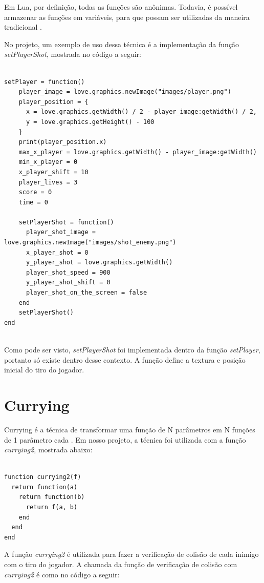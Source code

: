 \documentclass[rel_mlp]{iiufrgs}
\begin{document}
Em Lua, por definição, todas as funções são anônimas. Todavia, é possível armazenar as funções em variáveis, para que possam ser utilizadas da maneira tradicional \cite{IntroLuaPDF}.

No projeto, um exemplo de uso dessa técnica é a implementação da função \textit{setPlayerShot}, mostrada no código a seguir:

\begin{lstlisting}

setPlayer = function()
    player_image = love.graphics.newImage("images/player.png")
    player_position = {
      x = love.graphics.getWidth() / 2 - player_image:getWidth() / 2,
      y = love.graphics.getHeight() - 100
    }
    print(player_position.x)
    max_x_player = love.graphics.getWidth() - player_image:getWidth()
    min_x_player = 0
    x_player_shift = 10
    player_lives = 3
    score = 0
    time = 0

    setPlayerShot = function()
      player_shot_image = love.graphics.newImage("images/shot_enemy.png")
      x_player_shot = 0
      y_player_shot = love.graphics.getWidth()
      player_shot_speed = 900
      y_player_shot_shift = 0
      player_shot_on_the_screen = false
    end
    setPlayerShot()
end
    
\end{lstlisting}

Como pode ser visto, \textit{setPlayerShot} foi implementada dentro da função \textit{setPlayer}, portanto só existe dentro desse contexto. A função define a textura e posição inicial do tiro do jogador.

\section{Currying} \label{Currying}

Currying é a técnica de transformar uma função de N parâmetros em N funções de 1 parâmetro cada \cite{CurryingLua}. Em nosso projeto, a técnica foi utilizada com a função \textit{currying2}, mostrada abaixo:

\begin{lstlisting}

function currying2(f)
  return function(a)
    return function(b)
      return f(a, b)
    end
  end
end

\end{lstlisting}

A função \textit{currying2} é utilizada para fazer a verificação de colisão de cada inimigo com o tiro do jogador. A chamada da função de verificação de colisão com \textit{currying2} é como no código a seguir:
\end{document}
